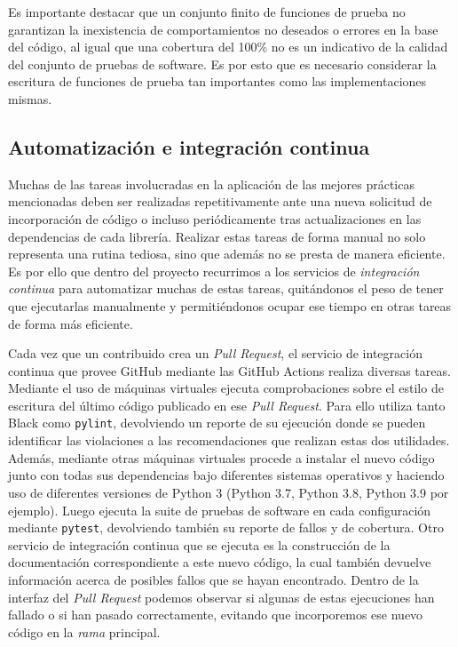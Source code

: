 Es importante destacar que un conjunto finito de funciones de prueba no
garantizan la inexistencia de comportamientos no deseados o errores en la base
del código, al igual que una cobertura del 100\% no es un indicativo de la
calidad del conjunto de pruebas de software.
Es por esto que es necesario considerar la escritura de funciones de prueba tan
importantes como las implementaciones mismas.


\subsection{Automatización e integración continua}
\label{sec:ci}

Muchas de las tareas involucradas en la aplicación de las mejores prácticas
mencionadas deben ser realizadas repetitivamente ante una nueva solicitud de
incorporación de código o incluso periódicamente tras actualizaciones en las
dependencias de cada librería.
Realizar estas tareas de forma manual no solo representa una rutina tediosa,
sino que además no se presta de manera eficiente.
Es por ello que dentro del proyecto recurrimos a los servicios de
\emph{integración continua} para automatizar muchas de estas tareas,
quitándonos el peso de tener que ejecutarlas manualmente y permitiéndonos
ocupar ese tiempo en otras tareas de forma más eficiente.

Cada vez que un contribuido crea un \emph{Pull Request}, el servicio de
integración continua que provee GitHub mediante las GitHub Actions realiza
diversas tareas.
Mediante el uso de máquinas virtuales ejecuta comprobaciones sobre el estilo de
escritura del último código publicado en ese \emph{Pull Request}.
Para ello utiliza tanto Black como \texttt{pylint}, devolviendo un reporte de
su ejecución donde se pueden identificar las violaciones a las recomendaciones
que realizan estas dos utilidades.
Además, mediante otras máquinas virtuales procede a instalar el nuevo código
junto con todas sus dependencias bajo diferentes sistemas operativos y haciendo
uso de diferentes versiones de Python 3 (Python 3.7, Python 3.8, Python 3.9 por
ejemplo).
Luego ejecuta la suite de pruebas de software en cada configuración mediante
\texttt{pytest}, devolviendo también su reporte de fallos y de cobertura.
Otro servicio de integración continua que se ejecuta es la construcción de la
documentación correspondiente a este nuevo código, la cual también devuelve
información acerca de posibles fallos que se hayan encontrado.
Dentro de la interfaz del \emph{Pull Request} podemos observar si algunas de
estas ejecuciones han fallado o si han pasado correctamente, evitando que
incorporemos ese nuevo código en la \emph{rama} principal.

